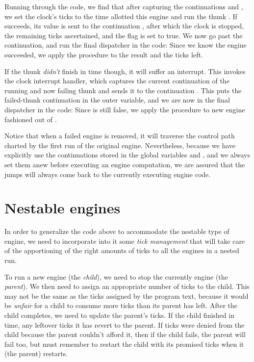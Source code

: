 Running through the code, we find that after capturing
the continuations  and
, we set the clock’s ticks to the
time allotted this engine and run the thunk .  If
 succeeds, its value  is sent to the
continuation , after which the
clock is stopped, the remaining ticks ascertained, and
the flag  is set to true.  We now
go past the  continuation, and run
the final dispatcher in the code: Since we know the
engine succeeded, we apply the  procedure to
the result and the ticks left.

If the thunk  {\em didn’t} finish in time
though, it will suffer an interrupt.  This invokes the
clock interrupt handler, which captures the current
continuation of the running and now failing thunk and
sends it to the continuation .  This
puts the failed-thunk continuation in the outer
 variable, and we are now in the final
dispatcher in the code: Since  is
still false, we apply the  procedure to new
engine fashioned out of .

Notice that when a failed engine is removed, it will
traverse the control path charted by the first run of
the original engine.  Nevertheless, because we have
explicitly use the continuations stored in the global
variables  and
, and we always set them anew before
executing an engine computation, we are assured that
the jumps will always come back to the currently
executing engine code.

\section{Nestable engines}

In order to generalize the code above to accommodate
the nestable type of engine, we need to incorporate
into it some {\em tick management} that will take
care of the apportioning of the right amounts of ticks
to all the engines in a nested run.

To run a new engine (the {\em child}), we need to
stop the currently engine (the {\em parent}).  We
then need to assign an appropriate number of ticks to
the child.  This may not be the same as the ticks
assigned by the program text, because it would be {\em
unfair} for a child to consume more ticks than its
parent has left.  After the child completes, we need to
update the parent’s ticks.  If the child finished in
time, any leftover ticks it has revert to the parent.
If ticks were denied from the child because the parent
couldn’t afford it, then if the child fails, the parent
will fail too, but must remember to restart the child
with its promised ticks when it (the parent) restarts.

